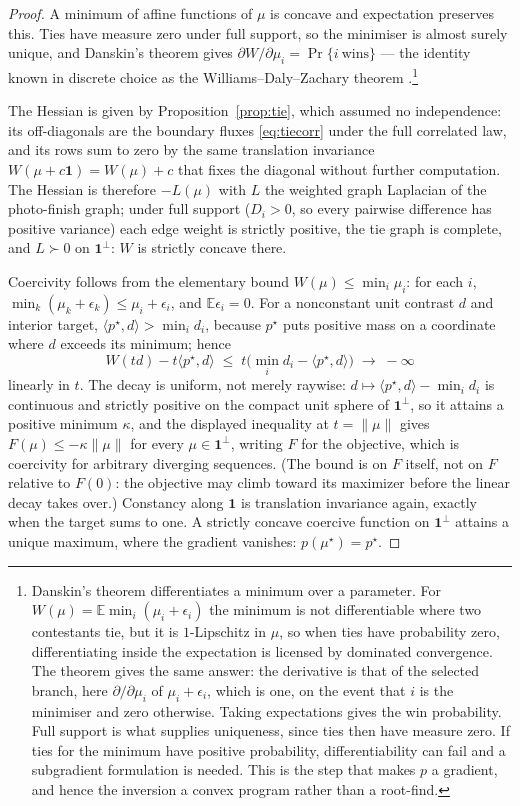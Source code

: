 \documentclass[11pt]{article}
\newcommand{\E}{\mathbb{E}}
\begin{document}
\begin{proof}
A minimum of affine functions of $\mu$ is concave and expectation
preserves this. Ties have measure zero under full support, so the
minimiser is almost surely unique, and Danskin's theorem
\citep{danskin1966} gives
$\partial W/\partial\mu_i=\Pr\{i\ \text{wins}\}$ --- the identity known
in discrete choice as the Williams--Daly--Zachary theorem
\citep{mcfadden1981}.\footnote{Danskin's
theorem differentiates a minimum over a parameter. For
$W(\mu)=\E\min_i(\mu_i+\epsilon_i)$ the minimum is not
differentiable where two contestants tie, but it is $1$-Lipschitz in
$\mu$, so when ties have probability zero, differentiating inside the
expectation is licensed by dominated convergence. The theorem gives the
same answer: the derivative is that of the selected branch, here $\partial/\partial\mu_i$ of
$\mu_i+\epsilon_i$, which is one, on the event that $i$ is the
minimiser and zero otherwise. Taking expectations gives the win
probability. Full support is what supplies uniqueness, since ties then
have measure zero. If ties for the minimum have positive probability,
differentiability can fail and a subgradient formulation is needed.
This is the step that makes $p$ a gradient, and hence the inversion a
convex program rather than a root-find.}

The Hessian is given by Proposition~\ref{prop:tie}, which assumed no
independence: its off-diagonals are the boundary fluxes
\eqref{eq:tiecorr} under the full correlated law, and its rows sum to
zero by the same translation invariance $W(\mu+c\mathbf{1})=W(\mu)+c$
that fixes the diagonal without further computation. The Hessian is
therefore $-L(\mu)$ with $L$ the weighted graph Laplacian of the
photo-finish graph; under full support ($D_i>0$, so every pairwise difference has
positive variance) each edge weight is strictly positive, the tie graph
is complete, and $L\succ0$ on $\mathbf{1}^{\perp}$: $W$ is strictly
concave there.

Coercivity follows from the elementary bound
$W(\mu)\le\min_i\mu_i$: for each $i$,
$\min_k(\mu_k+\epsilon_k)\le\mu_i+\epsilon_i$, and $\E\epsilon_i=0$.
For a nonconstant unit contrast $d$ and interior target,
$\langle p^{\star},d\rangle>\min_i d_i$, because $p^{\star}$ puts
positive mass on a coordinate where $d$ exceeds its minimum; hence
\[
W(td)-t\langle p^{\star},d\rangle
 \;\le\; t\bigl(\min_i d_i-\langle p^{\star},d\rangle\bigr)
 \;\longrightarrow\;-\infty
\]
linearly in $t$. The decay is uniform, not merely raywise:
$d\mapsto\langle p^{\star},d\rangle-\min_i d_i$ is continuous and
strictly positive on the compact unit sphere of $\mathbf{1}^{\perp}$,
so it attains a positive minimum $\kappa$, and the displayed inequality
at $t=\lVert\mu\rVert$ gives $F(\mu)\le-\kappa\lVert\mu\rVert$ for every
$\mu\in\mathbf{1}^{\perp}$, writing $F$ for the objective, which is
coercivity for arbitrary diverging sequences. (The bound is on $F$
itself, not on $F$ relative to $F(0)$: the objective may climb toward
its maximizer before the linear decay takes over.) Constancy along
$\mathbf{1}$ is translation invariance
again, exactly when the target sums to one. A strictly concave coercive
function on $\mathbf{1}^{\perp}$ attains a unique maximum, where the
gradient vanishes: $p(\mu^{\star})=p^{\star}$.


\end{proof}
\end{document}
